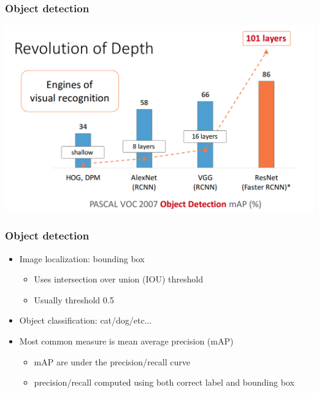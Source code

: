\documentclass{beamer}
\begin{document}
\begin{frame}
	\frametitle{Object detection}
	\begin{center}
        \includegraphics[width=\textwidth]{figs/object-detect.png}
    \end{center}
	

\end{frame}
\begin{frame}
	\frametitle{Object detection}
\begin{itemize}
	\item Image localization: bounding box
	\begin{itemize}
		\item Uses intersection over union (IOU) threshold
		\item Usually threshold 0.5
	\end{itemize}
	
	\item Object classification: cat/dog/etc...
	\item Most common measure is mean average precision (mAP)
	\begin{itemize}
		\item mAP are under the precision/recall curve
		\item precision/recall computed using both correct label and bounding box
	\end{itemize}
\end{itemize}
	

\end{frame}
\end{document}
